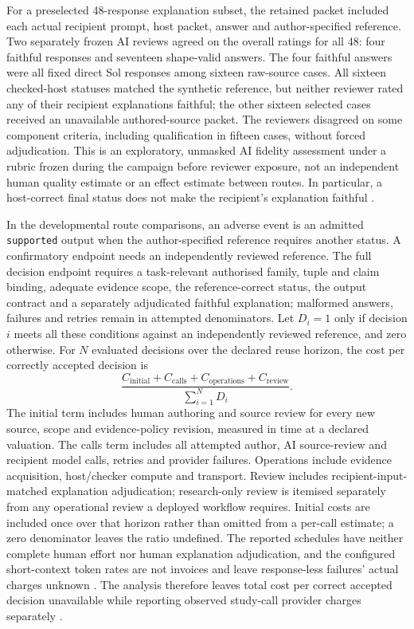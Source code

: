 \documentclass[preprint,12pt]{elsarticle}
\begin{document}
For a preselected 48-response explanation subset, the retained packet included each actual recipient prompt, host packet, answer and author-specified reference. Two separately frozen AI reviews agreed on the overall ratings for all 48: four faithful responses and seventeen shape-valid answers. The four faithful answers were all fixed direct Sol responses among sixteen raw-source cases. All sixteen checked-host statuses matched the synthetic reference, but neither reviewer rated any of their recipient explanations faithful; the other sixteen selected cases received an unavailable authored-source packet. The reviewers disagreed on some component criteria, including qualification in fifteen cases, without forced adjudication. This is an exploratory, unmasked AI fidelity assessment under a rubric frozen during the campaign before reviewer exposure, not an independent human quality estimate or an effect estimate between routes. In particular, a host-correct final status does not make the recipient's explanation faithful \citep{earlDeployment800Explanation}.

In the developmental route comparisons, an adverse event is an admitted \texttt{supported} output when the author-specified reference requires another status. A confirmatory endpoint needs an independently reviewed reference. The full decision endpoint requires a task-relevant authorised family, tuple and claim binding, adequate evidence scope, the reference-correct status, the output contract and a separately adjudicated faithful explanation; malformed answers, failures and retries remain in attempted denominators. Let \(D_i=1\) only if decision \(i\) meets all these conditions against an independently reviewed reference, and zero otherwise. For \(N\) evaluated decisions over the declared reuse horizon, the cost per correctly accepted decision is
\begin{equation}
 \frac{C_{\mathrm{initial}}+C_{\mathrm{calls}}+C_{\mathrm{operations}}+C_{\mathrm{review}}}
 {\sum_{i=1}^{N}D_i}.
 \label{eq:total-cost}
\end{equation}
The initial term includes human authoring and source review for every new source, scope and evidence-policy revision, measured in time at a declared valuation. The calls term includes all attempted author, AI source-review and recipient model calls, retries and provider failures. Operations include evidence acquisition, host/checker compute and transport. Review includes recipient-input-matched explanation adjudication; research-only review is itemised separately from any operational review a deployed workflow requires. Initial costs are included once over that horizon rather than omitted from a per-call estimate; a zero denominator leaves the ratio undefined. The reported schedules have neither complete human effort nor human explanation adjudication, and the configured short-context token rates are not invoices and leave response-less failures' actual charges unknown \citep{openaiPricing2026}. The analysis therefore leaves total cost per correct accepted decision unavailable while reporting observed study-call provider charges separately \citep{earlCampaign}.
\end{document}
